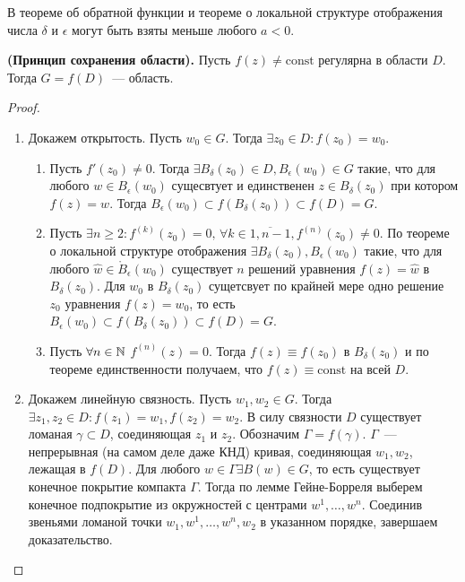 \begin{note}
В теореме об обратной функции и теореме о локальной структуре отображения числа \(\delta\) и
\(\epsilon\) могут быть взяты меньше любого \(a < 0\).
\end{note}

\begin{statement}
\textbf{(Принцип сохранения области).} Пусть \(f(z) \ne \mathrm{const}\) регулярна в области \(D\).
Тогда \(G = f(D)\)~--- область.
\end{statement}

\begin{proof}
\begin{enumerate}[wide=20pt, label=\Roman*., itemsep=0ex]
\item Докажем открытость. Пусть \(w_0 \in G\). Тогда \(\exists z_0 \in D\colon f(z_0) = w_0\).
    \begin{enumerate}[wide=20pt, itemsep=0ex]
    \item Пусть \(f'(z_0) \ne 0\). Тогда \(\exists B_\delta(z_0) \in D, B_\epsilon(w_0) \in G\)
        такие, что для любого \(w \in B_\epsilon(w_0)\) сущесвтует и единственен \(z \in
        B_\delta(z_0)\) при котором \(f(z) = w\). Тогда \(B_\epsilon(w_0) \subset f(B_\delta(z_0))
        \subset f(D) = G\).
    \item Пусть \(\exists n \ge 2\colon f^{(k)}(z_0) = 0,\, \forall k \in \overline{1, n-1}, 
        f^{(n)}(z_0) \ne 0\). По теореме о локальной структуре отображения \(\exists B_\delta(z_0),
        B_\epsilon(w_0)\) такие, что для любого \(\hat{w} \in \mathring{B}_\epsilon(w_0)\)
        существует \(n\) решений уравнения \(f(z) = \hat{w}\) в \(B_\delta(z_0)\). Для \(w_0\) в
        \(B_\delta(z_0)\) сущетсвует по крайней мере одно решение \(z_0\) уравнения \(f(z) = w_0\),
        то есть \(B_\epsilon(w_0) \subset f(B_\delta(z_0)) \subset f(D) = G\).
    \item Пусть \(\forall n \in \mathbb{N}\) \(f^{(n)}(z) = 0\). Тогда \(f(z) \equiv f(z_0)\) в 
        \(B_\delta(z_0)\) и по теореме единственности получаем, что \(f(z) \equiv \mathrm{const}\)
        на всей \(D\).
    \end{enumerate}
\item Докажем линейную связность. Пусть \(w_1, w_2 \in G\). Тогда \(\exists z_1, z_2 \in D \colon
    f(z_1) = w_1, f(z_2) = w_2\). В силу связности \(D\) существует ломаная \(\gamma \subset D\),
    соединяющая \(z_1\) и \(z_2\). Обозначим \(\Gamma = f(\gamma)\). \(\Gamma\)~--- непрерывная (на
    самом деле даже КНД) кривая, соединяющая \(w_1, w_2\), лежащая в \(f(D)\). Для любого \(w \in
    \Gamma \exists B(w) \in G\), то есть существует конечное покрытие компакта \(\Gamma\). Тогда
    по лемме Гейне-Борреля выберем конечное подпокрытие из окружностей с центрами \(w^1, \dots, 
    w^n\). Соединив звеньями ломаной точки \(w_1, w^1, \dots, w^n, w_2\) в указанном порядке,
    завершаем доказательство.
\end{enumerate}
\end{proof}

